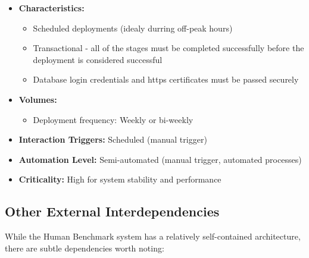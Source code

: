 \begin{itemize}
    \item \textbf{Characteristics:}
          \begin{itemize}
              \item Scheduled deployments (idealy durring off-peak hours)
              \item Transactional - all of the stages must be completed successfully before the deployment
                    is considered successful
              \item Database login credentials and https certificates must be passed securely
          \end{itemize}
    \item \textbf{Volumes:}
          \begin{itemize}
              \item Deployment frequency: Weekly or bi-weekly
          \end{itemize}
    \item \textbf{Interaction Triggers:} Scheduled (manual trigger)
    \item \textbf{Automation Level:} Semi-automated (manual trigger, automated processes)
    \item \textbf{Criticality:} High for system stability and performance
\end{itemize}


\subsection{Other External Interdependencies}

While the Human Benchmark system has a relatively self-contained architecture, there are subtle dependencies worth noting:

